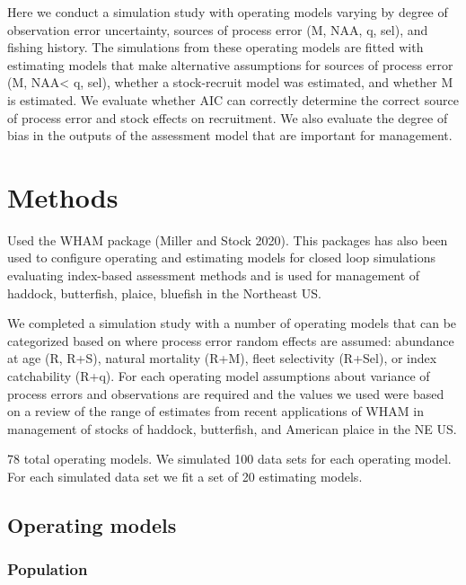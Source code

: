 \documentclass[
  12pt,
]{article}
\begin{document}
Here we conduct a simulation study with operating models varying by
degree of observation error uncertainty, sources of process error (M,
NAA, q, sel), and fishing history. The simulations from these operating
models are fitted with estimating models that make alternative
assumptions for sources of process error (M, NAA\textless{} q, sel),
whether a stock-recruit model was estimated, and whether M is estimated.
We evaluate whether AIC can correctly determine the correct source of
process error and stock effects on recruitment. We also evaluate the
degree of bias in the outputs of the assessment model that are important
for management.

\hypertarget{methods}{%
\section*{Methods}\label{methods}}

Used the WHAM package \citep[][commit 77bbd94]{stockmiller21} (Miller
and Stock 2020). This packages has also been used to configure operating
and estimating models for closed loop simulations evaluating index-based
assessment methods \citep{legaultetal23} and is used for management of
haddock, butterfish, plaice, bluefish in the Northeast US.

We completed a simulation study with a number of operating models that
can be categorized based on where process error random effects are
assumed: abundance at age (R, R+S), natural mortality (R+M), fleet
selectivity (R+Sel), or index catchability (R+q). For each operating
model assumptions about variance of process errors and observations are
required and the values we used were based on a review of the range of
estimates from recent applications of WHAM in management of stocks of
haddock, butterfish, and American plaice in the NE US.

78 total operating models. We simulated 100 data sets for each operating
model. For each simulated data set we fit a set of 20 estimating models.

\hypertarget{operating-models}{%
\subsection*{Operating models}\label{operating-models}}

\hypertarget{population}{%
\subsubsection*{Population}\label{population}}
\end{document}
